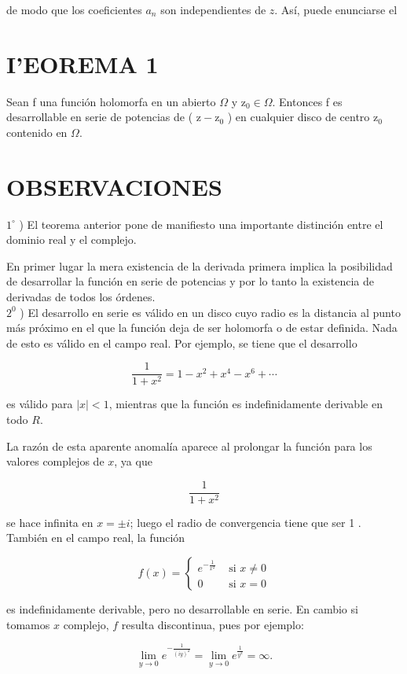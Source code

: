 \documentclass[10pt]{article}
\theoremstyle{plain}
\theoremstyle{definition}
\theoremstyle{remark}
\begin{document}
de modo que los coeficientes $a_{n}$ son independientes de $z$. Así, puede enunciarse el

\section*{I'EOREMA 1}
Sean f una función holomorfa en un abierto $\Omega$ y $\mathrm{z}_{0} \in \Omega$. Entonces f es desarrollable en serie de potencias de ( $\mathrm{z}-\mathrm{z}_{0}$ ) en cualquier disco de centro $\mathrm{z}_{0}$ contenido en $\Omega$.

\section*{OBSERVACIONES}
$1^{\circ}$ ) El teorema anterior pone de manifiesto una importante distinción entre el dominio real y el complejo.

En primer lugar la mera existencia de la derivada primera implica la posibilidad de desarrollar la función en serie de potencias y por lo tanto la existencia de derivadas de todos los órdenes.\\
$2^{0}$ ) El desarrollo en serie es válido en un disco cuyo radio es la distancia al punto más próximo en el que la función deja de ser holomorfa o de estar definida. Nada de esto es válido en el campo real. Por ejemplo, se tiene que el desarrollo

$$
\frac{1}{1+x^{2}}=1-x^{2}+x^{4}-x^{6}+\cdots
$$

es válido para $|x|<1$, mientras que la función es indefinidamente derivable en todo $R$.

La razón de esta aparente anomalía aparece al prolongar la función para los valores complejos de $x$, ya que

$$
\frac{1}{1+x^{2}}
$$

se hace infinita en $x= \pm i$; luego el radio de convergencia tiene que ser 1 .\\
También en el campo real, la función

$$
f(x)= \begin{cases}e^{-\frac{1}{x^{2}}} & \text { si } x \neq 0 \\ 0 & \text { si } x=0\end{cases}
$$

es indefinidamente derivable, pero no desarrollable en serie. En cambio si tomamos $x$ complejo, $f$ resulta discontinua, pues por ejemplo:

$$
\lim _{y \rightarrow 0} e^{-\frac{1}{(i y)^{2}}}=\lim _{y \rightarrow 0} e^{\frac{1}{y^{2}}}=\infty .
$$
\end{document}
